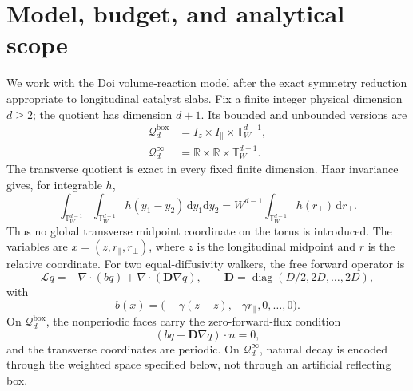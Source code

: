 \documentclass[aps,physrev,onecolumn,amsmath,amssymb,longbibliography]{revtex4-2}
\newcommand{\dd}{\mathrm d}
\newcommand{\Lfree}{\mathcal L}
\newcommand{\Qbox}{\mathcal Q_d^{\mathrm{box}}}
\newcommand{\Qinf}{\mathcal Q_d^{\infty}}
\begin{document}
\section{Model, budget, and analytical scope}
\label{sec:supp-model}

We work with the Doi volume-reaction model \cite{doi1976stochastic} after the
exact symmetry reduction appropriate to longitudinal catalyst slabs.  Fix a
finite integer physical dimension \(d\ge2\); the quotient has dimension
\(d+1\).  Its bounded and unbounded versions are
\begin{align}
 \Qbox&=I_z\times I_{\parallel}\times\mathbb T_W^{d-1},
 \label{eq:qbox}\\
 \Qinf&=\mathbb R\times\mathbb R\times\mathbb T_W^{d-1}.
 \label{eq:qinf}
\end{align}
The transverse quotient is exact in every fixed finite dimension.  Haar
invariance gives, for integrable \(h\),
\begin{equation}
 \int_{\mathbb T_W^{d-1}}\!\int_{\mathbb T_W^{d-1}}
 h(y_1-y_2)\,\dd y_1\dd y_2
 =W^{d-1}\int_{\mathbb T_W^{d-1}}h(r_\perp)\,\dd r_\perp.
 \label{eq:diagonal-haar-quotient}
\end{equation}
Thus no global transverse midpoint coordinate on the torus is introduced.
The variables are \(x=(z,r_\parallel,r_\perp)\), where \(z\) is the
longitudinal midpoint and \(r\) is the relative coordinate.  For two
equal-diffusivity walkers, the free forward operator is
\begin{equation}
 \Lfree q=-\nabla\!\cdot(bq)+\nabla\!\cdot(\bm D\nabla q),
 \qquad
 \bm D=\operatorname{diag}(D/2,2D,\ldots,2D),
 \label{eq:free-generator}
\end{equation}
with
\begin{equation}
 b(x)=\bigl(-\gamma(z-\bar z),-\gamma r_\parallel,0,\ldots,0\bigr).
 \label{eq:drift}
\end{equation}
On \(\Qbox\), the nonperiodic faces carry the zero-forward-flux condition
\begin{equation}
 (bq-\bm D\nabla q)\cdot n=0,
 \label{eq:no-flux}
\end{equation}
and the transverse coordinates are periodic.  On \(\Qinf\), natural decay is
encoded through the weighted space specified below, not through an artificial
reflecting box.
\end{document}
